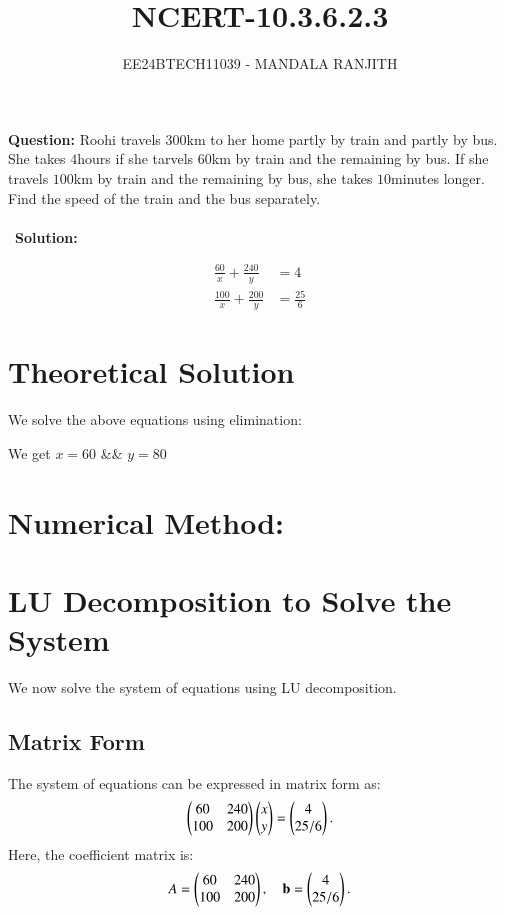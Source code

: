\documentclass[article]{IEEEtran}
\numberwithin{figure}{enumi}
\begin{document}

\title{NCERT-10.3.6.2.3}
\author{EE24BTECH11039 - MANDALA RANJITH}
{\let\newpage\relax\maketitle}


\noindent\textbf{Question: }  
Roohi travels $300$km to her home partly by train and partly by bus. She takes $4$hours if she tarvels $60$km by train and the remaining by bus. If she travels $100$km by train and the remaining by bus, she takes $10$minutes longer. Find the speed of the train and the bus separately.\\\\\
\noindent\textbf{Solution: } 

\begin{align}
    \frac{60}{x} + \frac{240}{y} &= 4 \\
    \frac{100}{x} + \frac{200}{y} &= \frac{25}{6}
\end{align}

\section{Theoretical Solution}
We solve the above equations using elimination:

We get $x=60$ && $y=80$



\section{Numerical Method:}
\section{LU Decomposition to Solve the System}
We now solve the system of equations using LU decomposition.

\subsection{Matrix Form}
The system of equations can be expressed in matrix form as:
\begin{equation}
    \begin{pmatrix}
    60 & 240 \\
    100 & 200
    \end{pmatrix} \begin{pmatrix}x \\ y\end{pmatrix} = \begin{pmatrix}4 \\ 25/6\end{pmatrix}.
\end{equation}
Here, the coefficient matrix is:
\begin{equation}
    A = \begin{pmatrix}60 & 240 \\
    100 & 200\end{pmatrix}, \quad \mathbf{b} = \begin{pmatrix}4 \\ 25/6\end{pmatrix}.
\end{equation}
\end{document}
